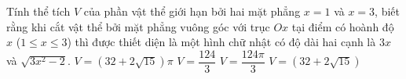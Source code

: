 \begin{ex}%
	Tính thể tích $V$ của phần vật thể giới hạn bởi hai mặt phẳng $x=1$ và $x=3$, biết rằng khi cắt vật thể bởi mặt phẳng vuông góc với trục $Ox$ tại điểm có hoành độ $x$ ($1\le x\le 3$) thì được thiết diện là một hình chữ nhật có độ dài hai cạnh là $3x$ và $\sqrt{3x^2-2}$.
	\choice
	{$V=(32+2\sqrt{15})\pi$}
	{\True $V=\dfrac{124}{3}$}
	{$V=\dfrac{124\pi}{3}$}
	{$V=(32+2\sqrt{15})$}
\end{ex}

